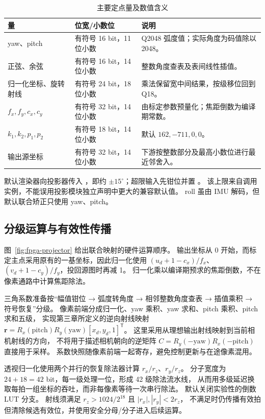 \begin{table}[htbp]\centering\small
\caption{主要定点量及数值含义}\label{tab:fpga-fixed-point}
\begin{tabularx}{\textwidth}{p{4.0cm}p{3.2cm}Y}
\toprule 量 & 位宽/小数位 & 说明 \\\midrule
yaw、pitch & 有符号 16 bit，11 位小数 & Q2048 弧度值；实际角度为码值除以 2048。\\
正弦、余弦 & 有符号 16 bit，14 位小数 & 整数角度查表及表间线性插值。\\
归一化坐标、旋转射线 & 有符号 24 bit，18 位小数 & 乘法保留宽中间结果，按级移位回到 Q18。\\
$f_x,f_y,c_x,c_y$ & 有符号 32 bit，14 位小数 & 由标定参数预量化；焦距倒数为编译期常数。\\
$k_1,k_2,p_1,p_2$ & 有符号 18 bit，14 位小数 & 默认 $162,-711,0,0$。\\
输出源坐标 & 有符号 32 bit，14 位小数 & 下游按整数部分及最高小数位进行最近邻舍入。\\
\bottomrule
\end{tabularx}
\end{table}
默认渲染器向投影器传入 ，即约
$\pm15^\circ$；超限输入先钳位并置 。
该上限来自调用实例，不能误用投影模块独立声明中更大的兼容默认值。
roll 虽由 IMU 解码，但默认联合矫正只使用 yaw、pitch。

\subsection{分级运算与有效性传播}
图~\ref{fig:fpga-projector} 给出联合映射的硬件运算顺序。
输出坐标从 0 开始，而标定主点采用原有的一基坐标，因此归一化使用
$(u_d+1-c_x)/f_x$、$(v_d+1-c_y)/f_y$，投回源图时再减 1。
归一化乘以编译期预求的焦距倒数，不在像素通路中计算焦距除法。


三角系数准备按“幅值钳位 → 弧度转角度 → 相邻整数角度查表 → 插值乘积 → 符号恢复”分级。
像素前端分成归一化、yaw 乘积、yaw 求和、pitch 乘积、pitch 求和五级，
实现第三章所定义的逆向射线映射
$\boldsymbol{r}=R_x(\mathrm{pitch})R_y(\mathrm{yaw})[x_d,y_d,1]^\mathsf{T}$。
这里采用从理想输出射线映射到当前相机射线的方向，
不将用于描述相机朝向的逆矩阵 $C=R_y(-\mathrm{yaw})R_x(-\mathrm{pitch})$ 直接用于采样。
系数快照随像素前端一起寄存，避免控制更新与在途像素混用。

透视归一化使用两个并行的恢复除法器计算 $r_x/r_z$、$r_y/r_z$。
分子宽度为 $24+18=42$ bit，每一级处理一位，形成 42 级除法流水线，
从而用多级延迟换取每拍一组坐标的吞吐，而非每像素等待一次串行除法。
默认关闭实验性的倒数 LUT 分支。
射线须满足 $r_z>1024/2^{18}$ 且 $|r_x|,|r_y|<2r_z$，
不满足时仍传播有效拍但清除候选有效位，并使用安全分母/分子进入后续运算。

